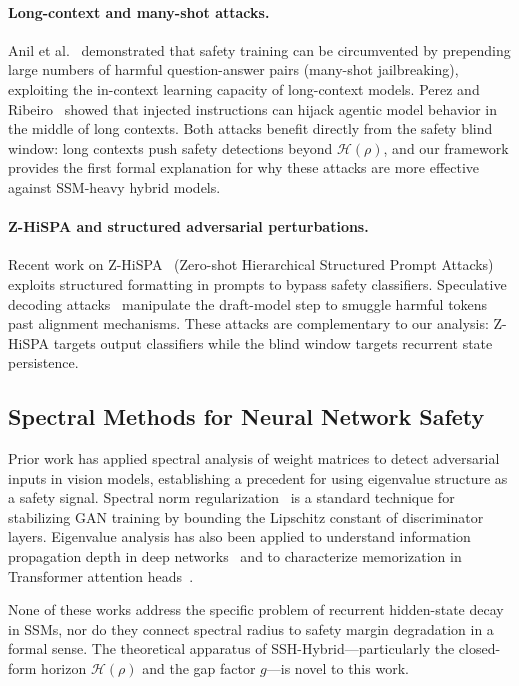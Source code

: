 \documentclass{article}
\newcommand{\Horizon}{\mathcal{H}(\rho)}
\begin{document}
\paragraph{Long-context and many-shot attacks.}
Anil et al.~\cite{anil2024many} demonstrated that safety training can be
circumvented by prepending large numbers of harmful question-answer pairs (many-shot
jailbreaking), exploiting the in-context learning capacity of long-context models.
Perez and Ribeiro~\cite{perez2022ignore} showed that injected instructions can
hijack agentic model behavior in the middle of long contexts.  Both attacks
benefit directly from the safety blind window: long contexts push safety
detections beyond $\Horizon$, and our framework provides the first formal
explanation for why these attacks are more effective against SSM-heavy hybrid
models.

\paragraph{Z-HiSPA and structured adversarial perturbations.}
Recent work on Z-HiSPA~\cite{zhang2024zhispa} (Zero-shot Hierarchical Structured
Prompt Attacks) exploits structured formatting in prompts to bypass safety
classifiers.  Speculative decoding attacks~\cite{chen2024speculative} manipulate
the draft-model step to smuggle harmful tokens past alignment mechanisms.
These attacks are complementary to our analysis: Z-HiSPA targets output
classifiers while the blind window targets recurrent state persistence.

\subsection{Spectral Methods for Neural Network Safety}

Prior work has applied spectral analysis of weight
matrices to detect adversarial inputs in vision models, establishing a precedent
for using eigenvalue structure as a safety signal.  Spectral norm
regularization~\cite{miyato2018spectral} is a standard technique for stabilizing
GAN training by bounding the Lipschitz constant of discriminator layers.
Eigenvalue analysis has also been applied to understand information propagation
depth in deep networks~\cite{pennington2017resurrecting} and to characterize
memorization in Transformer attention heads~\cite{elhage2021mathematical}.

None of these works address the specific problem of recurrent hidden-state
decay in SSMs, nor do they connect spectral radius to safety margin degradation
in a formal sense.  The theoretical apparatus of SSH-Hybrid---particularly the
closed-form horizon $\Horizon$ and the gap factor $g$---is novel to this work.
\end{document}
